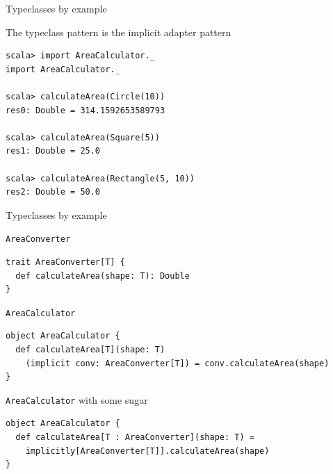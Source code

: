 \begin{frame}[fragile]{Typeclasses by example}
\begin{exampleblock}{The typeclass pattern is the implicit adapter pattern}
\begin{lstlisting}
scala> import AreaCalculator._
import AreaCalculator._

scala> calculateArea(Circle(10))
res0: Double = 314.1592653589793

scala> calculateArea(Square(5))
res1: Double = 25.0

scala> calculateArea(Rectangle(5, 10))
res2: Double = 50.0
\end{lstlisting}
\end{exampleblock}
\end{frame}

\begin{frame}[fragile]{Typeclasses by example}
\begin{exampleblock}{\lstinline!AreaConverter!}
\begin{lstlisting}
trait AreaConverter[T] {
  def calculateArea(shape: T): Double
}
\end{lstlisting}
\end{exampleblock}
\begin{exampleblock}{\lstinline!AreaCalculator!}
\begin{lstlisting}
object AreaCalculator {
  def calculateArea[T](shape: T)
    (implicit conv: AreaConverter[T]) = conv.calculateArea(shape)
}
\end{lstlisting}
\end{exampleblock}
\begin{exampleblock}{\lstinline!AreaCalculator! with some sugar}
\begin{lstlisting}
object AreaCalculator {
  def calculateArea[T : AreaConverter](shape: T) =
    implicitly[AreaConverter[T]].calculateArea(shape)
}
\end{lstlisting}
\end{exampleblock}
\end{frame}

